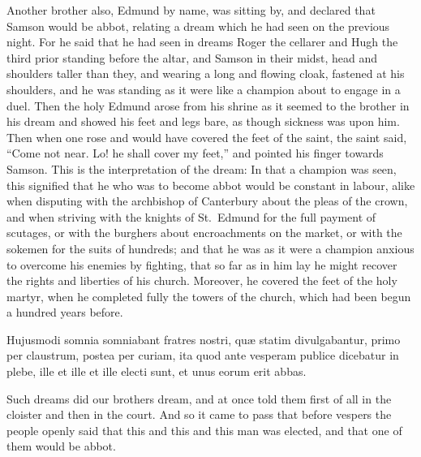 \documentclass[10pt]{book}
\begin{document}
\begin{paracol}{2}
\switchcolumn

Another brother also, Edmund by name, was sitting by, and declared that Samson would be abbot, relating a dream which he had seen on the previous night. For he said that he had seen in dreams Roger the cellarer and Hugh the third prior standing before the altar, and Samson in their midst, head and shoulders taller than they, and wearing a long and flowing cloak, fastened at his shoulders, and he was standing as it were like a champion about to engage in a duel. Then the holy Edmund arose from his shrine ­as it seemed to the brother in his dream ­and showed his feet and legs bare, as though sickness was upon him. Then when one rose and would have covered the feet of the saint, the saint said, ``Come not near. Lo! he shall cover my feet,'' and pointed his finger towards Samson. This is the interpretation of the dream: In that a champion was seen, this signified that he who was to become abbot would be constant in labour, alike when disputing with the archbishop of Canterbury about the pleas of the crown, and when striving with the knights of St.\ Edmund for the full payment of scutages, or with the burghers about encroachments on the market, or with the sokemen for the suits of hundreds; and that he was as it were a champion anxious to overcome his enemies by fighting, that so far as in him lay he might recover the rights and liberties of his church. Moreover, he covered the feet of the holy martyr, when he completed fully the towers of the church, which had been begun a hundred years before.

\switchcolumn*

\begin{otherlanguage}{latin}
Hujusmodi somnia somniabant fratres nostri, qu\ae{} statim divulgabantur, primo per claustrum, postea per curiam, ita quod ante vesperam publice dicebatur in plebe, ille et ille et ille electi sunt, et unus eorum erit abbas.
\end{otherlanguage}

\switchcolumn

Such dreams did our brothers dream, and at once told them first of all in the cloister and then in the court. And so it came to pass that before vespers the people openly said that this and this and this man was elected, and that one of them would be abbot.

\switchcolumn*


\end{paracol}
\end{document}
